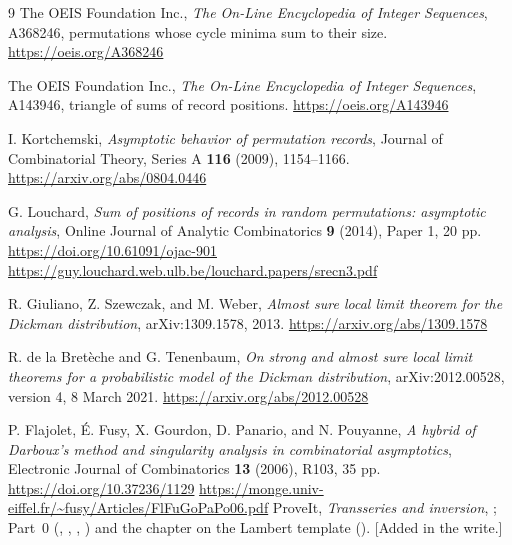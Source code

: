 \begin{thebibliography}{9}
The OEIS Foundation Inc., \emph{The On-Line Encyclopedia of Integer Sequences}, A368246, permutations whose cycle minima sum to their size.\newline
\url{https://oeis.org/A368246}

The OEIS Foundation Inc., \emph{The On-Line Encyclopedia of Integer Sequences}, A143946, triangle of sums of record positions.\newline
\url{https://oeis.org/A143946}

I. Kortchemski, \emph{Asymptotic behavior of permutation records}, Journal of Combinatorial Theory, Series A \textbf{116} (2009), 1154--1166.\newline
\url{https://arxiv.org/abs/0804.0446}

G. Louchard, \emph{Sum of positions of records in random permutations: asymptotic analysis}, Online Journal of Analytic Combinatorics \textbf{9} (2014), Paper 1, 20 pp.\newline
\url{https://doi.org/10.61091/ojac-901}\newline
\url{https://guy.louchard.web.ulb.be/louchard.papers/srecn3.pdf}

R. Giuliano, Z. Szewczak, and M. Weber, \emph{Almost sure local limit theorem for the Dickman distribution}, arXiv:1309.1578, 2013.\newline
\url{https://arxiv.org/abs/1309.1578}

R. de la Bret\`eche and G. Tenenbaum, \emph{On strong and almost sure local limit theorems for a probabilistic model of the Dickman distribution}, arXiv:2012.00528, version 4, 8 March 2021.\newline
\url{https://arxiv.org/abs/2012.00528}

P. Flajolet, \'E. Fusy, X. Gourdon, D. Panario, and N. Pouyanne,
\emph{A hybrid of Darboux's method and singularity analysis in combinatorial asymptotics}, Electronic Journal of Combinatorics \textbf{13} (2006), R103, 35 pp.\newline
\url{https://doi.org/10.37236/1129}\newline
\url{https://monge.univ-eiffel.fr/~fusy/Articles/FlFuGoPaPo06.pdf}
ProveIt, \emph{Transseries and inversion}, ; Part~0 (, , , ) and the chapter on the Lambert template (). [Added in the write.]
\end{thebibliography}
